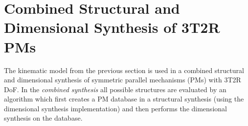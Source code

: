\documentclass[
	graybox,
	vecphys] %
	{svmult}
\begin{document}
\vspace{-0.5cm}
\section{Combined Structural and Dimensional Synthesis of 3T2R PMs}
\vspace{-0.4cm}
\label{sec:synthesis}

The kinematic model from the previous section is used in a combined structural and dimensional synthesis of symmetric parallel mechanisms (PMs) with 3T2R DoF.
In the \emph{combined synthesis} all possible structures are evaluated by an algorithm which first creates a PM database in a structural synthesis (using the dimensional synthesis implementation) and then performs the dimensional synthesis on the database.
\end{document}
